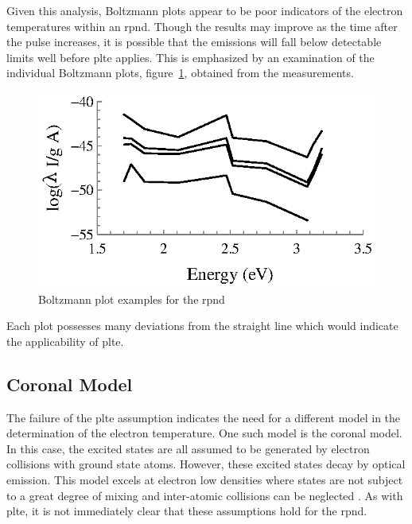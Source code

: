 Given this analysis, Boltzmann plots appear to be poor indicators of the
electron temperatures within an \acs{rpnd}. Though the results may improve as
the time after the pulse increases, it is possible that the emissions will fall
below detectable limits well before \acs{plte} applies. This is emphasized by an
examination of the individual Boltzmann plots, figure~\ref{fig:boltex}, obtained
from the measurements.
\begin{figure}
  \centering
  \includegraphics{./chapters/emissions/figures/boltex.eps}
  \caption{Boltzmann plot examples for the \acs{rpnd}}
  \label{fig:boltex}
\end{figure}
Each plot possesses many deviations from the straight line which would indicate
the applicability of \acs{plte}. 

\subsection{Coronal Model}

The failure of the \acs{plte} assumption indicates the need for a different
model in the determination of the electron temperature. One such model is the
coronal model. In this case, the excited states are all assumed to be generated
by electron collisions with ground state atoms. However, these excited states
decay by optical emission. This model excels at electron low densities where
states are not subject to a great degree of mixing and inter-atomic collisions
can be neglected \cite{Kunze2009}. As with \acs{plte}, it is not immediately
clear that these assumptions hold for the \acs{rpnd}.

